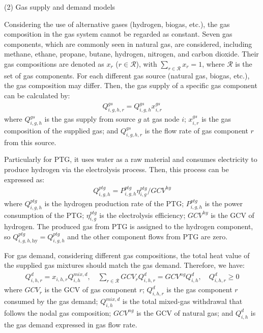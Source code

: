 \documentclass[sn-mathphys,Numbered]{sn-jnl}%
\theoremstyle{plain}%
\theoremstyle{definition}%
\theoremstyle{remark}%
\begin{document}
(2) Gas supply and demand models

Considering the use of alternative gases (hydrogen, biogas, etc.), the gas composition in the gas system cannot be regarded as constant. Seven gas components, which are commonly seen in natural gas, are considered, including methane, ethane, propane, butane, hydrogen, nitrogen, and carbon dioxide. Their gas compositions are denoted as $x_r$ ($r \in \mathcal{R}$), with $\sum_{r \in \mathcal{R}} x_r = 1$, where $\mathcal{R}$ is the set of gas components. For each different gas source (natural gas, biogas, etc.), the gas composition may differ. Then, the gas supply of a specific gas component can be calculated by:
\begin{gather}
    Q_{i,g,h,r}^{gs} = Q_{i,g,h}^{gs} x_{i,r}^{gs}
\end{gather}
where $Q_{i,g,h}^{gs}$ is the gas supply from source $g$ at gas node $i$; $x_{i,r}^{gs}$ is the gas composition of the supplied gas; and $Q_{i,g,h,r}^{gs}$ is the flow rate of gas component $r$ from this source.

Particularly for PTG, it uses water as a raw material and consumes electricity to produce hydrogen via the electrolysis process. Then, this process can be expressed as:
\begin{gather}
    Q_{i,g,h}^{ptg} = P_{i,g,h}^{ptg} \eta_{i,g}^{ptg} / GCV^{hy}
\end{gather}
where $Q_{i,g,h}^{ptg}$ is the hydrogen production rate of the PTG; $P_{i,g,h}^{ptg}$ is the power consumption of the PTG; $\eta_{i,g}^{ptg}$ is the electrolysis efficiency; $GCV^{hy}$ is the GCV of hydrogen.
The produced gas from PTG is assigned to the hydrogen component, so $Q_{i,g,h,\mathrm{hy}}^{ptg}=Q_{i,g,h}^{ptg}$ and the other component flows from PTG are zero.

For gas demand, considering different gas compositions, the total heat value of the supplied gas mixtures should match the gas demand. Therefore, we have:
\begin{gather}
    Q_{i,h,r}^{d} = x_{i,h,r} Q_{i,h}^{mix,d}, \quad
    \sum_{r \in \mathcal{R}} GCV_r Q_{i,h,r}^{d} = GCV^{ng} Q_{i,h}^{d}, \quad
    Q_{i,h,r}^{d} \geq 0
\end{gather}
where $GCV_r$ is the GCV of gas component $r$; $Q_{i,h,r}^{d}$ is the gas component $r$ consumed by the gas demand; $Q_{i,h}^{mix,d}$ is the total mixed-gas withdrawal that follows the nodal gas composition; $GCV^{ng}$ is the GCV of natural gas; and $Q_{i,h}^{d}$ is the gas demand expressed in gas flow rate.
\end{document}

